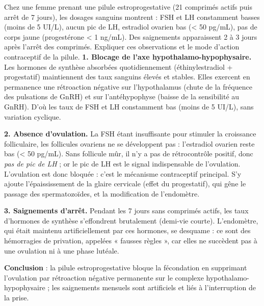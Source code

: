 \documentclass[11pt]{article}
\newcommand{\cle}[1]{{\popxbold\color{popdark}#1}}
\newcounter{popsec}
\newcounter{popsub}
\newcommand{\courssub}[1]{%
  \stepcounter{popsub}%
  \par\vspace{9pt}\noindent{\popxbold\fontsize{11.5}{13}\selectfont\color{popink}{\color{poporange}\thepopsec.\thepopsub}\hspace{6pt}#1}\par\nopagebreak\vspace{4pt}
}
\begin{document}
\begin{exoresolu}
Chez une femme prenant une pilule estroprogestative (21 comprimés actifs puis arrêt de 7 jours), les dosages sanguins montrent : FSH et LH constamment basses (moins de 5 UI/L), aucun pic de LH, estradiol ovarien bas (< 50 pg/mL), pas de corps jaune (progestérone < 1 ng/mL). Des saignements apparaissent 2 à 3 jours après l'arrêt des comprimés. Expliquer ces observations et le mode d'action contraceptif de la pilule.
\tcblower
\textbf{1. Blocage de l'axe hypothalamo-hypophysaire.} Les hormones de synthèse absorbées quotidiennement (éthinylestradiol + progestatif) maintiennent des taux sanguins élevés et stables. Elles exercent en permanence une \cle{rétroaction négative} sur l'hypothalamus (chute de la fréquence des pulsations de GnRH) et sur l'antéhypophyse (baisse de la sensibilité au GnRH). D'où les taux de FSH et LH constamment bas (moins de 5 UI/L), sans variation cyclique.

\textbf{2. Absence d'ovulation.} La FSH étant insuffisante pour stimuler la croissance folliculaire, les follicules ovariens ne se développent pas : l'estradiol ovarien reste bas (< 50 pg/mL). Sans follicule mûr, il n'y a pas de rétrocontrôle positif, donc \emph{pas de pic de LH} ; or le pic de LH est le signal indispensable de l'ovulation. L'ovulation est donc bloquée : c'est le mécanisme contraceptif principal. S'y ajoute l'épaississement de la glaire cervicale (effet du progestatif), qui gêne le passage des spermatozoïdes, et la modification de l'endomètre.

\textbf{3. Saignements d'arrêt.} Pendant les 7 jours sans comprimés actifs, les taux d'hormones de synthèse s'effondrent brutalement (demi-vie courte). L'endomètre, qui était maintenu artificiellement par ces hormones, se desquame : ce sont des hémorragies de privation, appelées « fausses règles », car elles ne succèdent pas à une ovulation ni à une phase lutéale.

\textbf{Conclusion} : la pilule estroprogestative bloque la fécondation en supprimant l'ovulation par rétroaction négative permanente sur le complexe hypothalamo-hypophysaire ; les saignements mensuels sont artificiels et liés à l'interruption de la prise.
\end{exoresolu}

\courssub{Méthode 5 : Interpréter un spermogramme}
\end{document}
